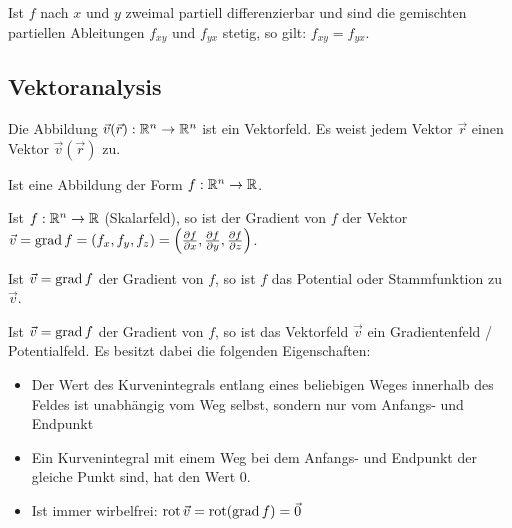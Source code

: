 \begin{satz}
Ist $f$ nach $x$ und $y$ zweimal partiell differenzierbar und sind die gemischten
partiellen Ableitungen $f_{xy}$ und $f_{yx}$ stetig, so gilt: $f_{xy} = f_{yx}$.
\end{satz}

\subsection{Vektoranalysis}
\begin{definition}[Vektorfeld]
Die Abbildung $\vec{v}(\vec{r}): \mathbb{R}^n \to \mathbb{R}^n$ ist ein Vektorfeld. Es weist jedem
Vektor $\vec{r}$ einen Vektor $\vec{v}(\vec{r})$ zu.
\end{definition}

\begin{definition}[Skalarfeld]
Ist eine Abbildung der Form $f: \mathbb{R}^n \to \mathbb{R}$.
\end{definition}

\begin{definition}[Gradient]
Ist $f: \mathbb{R}^n \to \mathbb{R}$ (Skalarfeld), so ist der Gradient von $f$ der Vektor
$\vec{v} = \operatorname{grad} f = (f_x, f_y, f_z) =
\left( \frac{\partial f}{\partial x}, \frac{\partial f}{\partial y}, \frac{\partial f}{\partial z} \right)$.
\end{definition}

\begin{definition}[Potential]
Ist $\vec{v} = \operatorname{grad} f$ der Gradient von $f$, so ist $f$ das Potential oder Stammfunktion zu $\vec{v}$.
\end{definition}

\begin{definition}
Ist $\vec{v} = \operatorname{grad} f$ der Gradient von $f$, so ist das Vektorfeld $\vec{v}$
ein Gradientenfeld / Potentialfeld. Es besitzt dabei die folgenden
Eigenschaften:
\begin{itemize}
	\item Der Wert des Kurvenintegrals entlang eines beliebigen Weges innerhalb des
	Feldes ist unabhängig vom Weg selbst, sondern nur vom Anfangs- und Endpunkt
	\item Ein Kurvenintegral mit einem Weg bei dem Anfangs- und Endpunkt der
	gleiche Punkt sind, hat den Wert 0.
	\item Ist immer wirbelfrei: $\operatorname{rot} \vec{v} = \operatorname{rot}(\operatorname{grad} f) = \vec{0}$
\end{itemize}
\end{definition}


